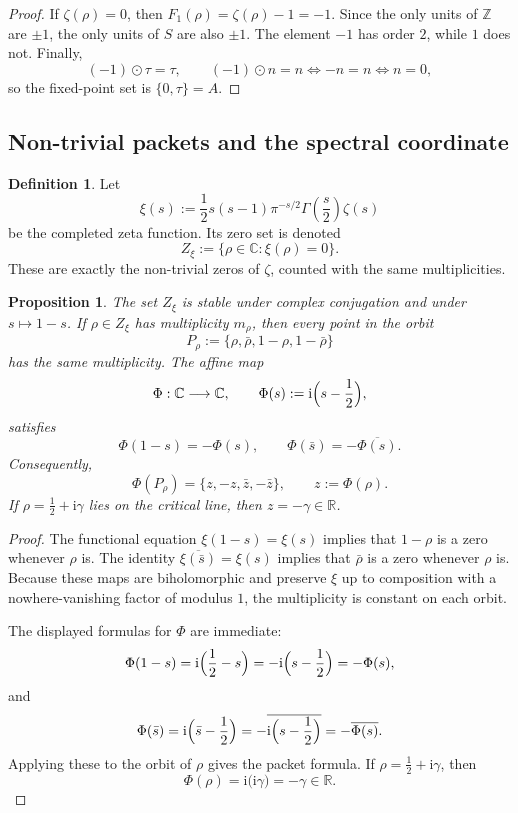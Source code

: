 \documentclass[11pt]{amsart}
\numberwithin{equation}{section}
\newtheorem{proposition}[theorem]{Proposition}
\theoremstyle{definition}
\newtheorem{definition}[theorem]{Definition}
\theoremstyle{remark}
\newcommand{\ZZ}{\mathbb Z}
\newcommand{\RR}{\mathbb R}
\newcommand{\CC}{\mathbb C}
\newcommand{\taup}{\tau}
\newcommand{\ii}{\mathrm i}
\begin{document}
\begin{proof}
If $\zeta(\rho)=0$, then $F_1(\rho)=\zeta(\rho)-1=-1$.  Since the only units of $\ZZ$ are $\pm1$, the only units of $S$ are also $\pm1$.  The element $-1$ has order $2$, while $1$ does not.  Finally,
\[
(-1)\odot\taup=\taup,
\qquad
(-1)\odot n=n\iff -n=n\iff n=0,
\]
so the fixed-point set is $\{0,\taup\}=A$.
\end{proof}

\subsection{Non-trivial packets and the spectral coordinate}

\begin{definition}
Let
\[
\xi(s):=\frac12 s(s-1)\pi^{-s/2}\Gamma\!\left(\frac s2\right)\zeta(s)
\]
be the completed zeta function.  Its zero set is denoted
\[
Z_\xi:=\{\rho\in\CC:\xi(\rho)=0\}.
\]
These are exactly the non-trivial zeros of $\zeta$, counted with the same multiplicities.
\end{definition}

\begin{proposition}\label{prop:packet-coordinate}
The set $Z_\xi$ is stable under complex conjugation and under $s\mapsto 1-s$.  If $\rho\in Z_\xi$ has multiplicity $m_\rho$, then every point in the orbit
\[
P_\rho:=\{\rho,\bar\rho,1-\rho,1-\bar\rho\}
\]
has the same multiplicity.  The affine map
\[
\Phi:\CC\longrightarrow \CC,
\qquad
\Phi(s):=\ii\Bigl(s-\frac12\Bigr),
\]
satisfies
\[
\Phi(1-s)=-\Phi(s),
\qquad
\Phi(\bar s)=-\overline{\Phi(s)}.
\]
Consequently,
\[
\Phi(P_\rho)=\{z,-z,\bar z,-\bar z\},
\qquad z:=\Phi(\rho).
\]
If $\rho=\tfrac12+\ii\gamma$ lies on the critical line, then $z=-\gamma\in\RR$.
\end{proposition}

\begin{proof}
The functional equation $\xi(1-s)=\xi(s)$ implies that $1-\rho$ is a zero whenever $\rho$ is.  The identity $\overline{\xi(\bar s)}=\xi(s)$ implies that $\bar\rho$ is a zero whenever $\rho$ is.  Because these maps are biholomorphic and preserve $\xi$ up to composition with a nowhere-vanishing factor of modulus $1$, the multiplicity is constant on each orbit.

The displayed formulas for $\Phi$ are immediate:
\[
\Phi(1-s)=\ii\Bigl(\frac12-s\Bigr)=-\ii\Bigl(s-\frac12\Bigr)=-\Phi(s),
\]
and
\[
\Phi(\bar s)=\ii\Bigl(\bar s-\frac12\Bigr)=-\overline{\ii\Bigl(s-\frac12\Bigr)}=-\overline{\Phi(s)}.
\]
Applying these to the orbit of $\rho$ gives the packet formula.  If $\rho=\tfrac12+\ii\gamma$, then
\[
\Phi(\rho)=\ii\bigl(\ii\gamma\bigr)=-\gamma\in\RR.
\]
\end{proof}
\end{document}
